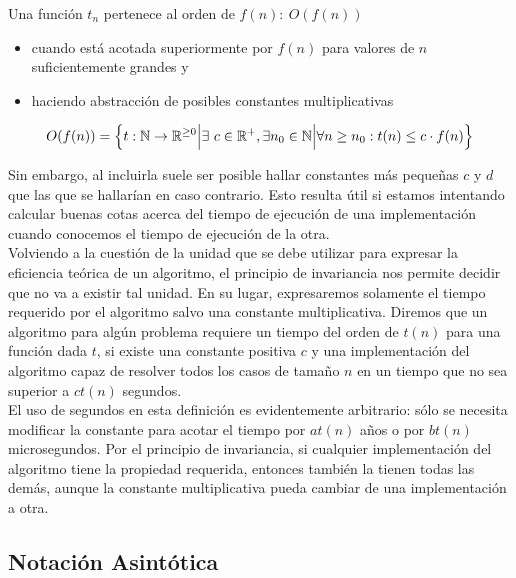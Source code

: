 \documentclass[a4paper,12pt]{article}
\begin{document}
\begin{fondo}
Una función $t_n$ pertenece al orden de $f(n):\ O(f(n))$
\begin{itemize}
\item cuando está acotada superiormente por $f(n)$ para valores de $n$ suficientemente grandes y
\item haciendo abstracción de posibles constantes multiplicativas
\end{itemize}
\begin{center}
\[O(f(n)) = \Bigl\{ t: \mathbb{N} \rightarrow \mathbb{R}^{\geq 0} \Bigl| \exists\ c \in \mathbb{R}^{+} , \exists n_{0} \in \mathbb{N} \Bigl| \forall n \geq n_{0} : t(n) \leq c \cdot f(n) \Bigl\} \]
\end{center}

\end{fondo}

Sin embargo, al incluirla suele ser posible hallar constantes más pequeñas $c$ y $d$ que las que se hallarían en caso contrario. Esto resulta útil si estamos intentando calcular buenas cotas acerca del tiempo de ejecución de una implementación cuando conocemos el tiempo de ejecución de la otra.\\

Volviendo a la cuestión de la unidad que se debe utilizar para expresar la eficiencia teórica de un algoritmo, el principio de invariancia nos permite decidir que no va a existir tal unidad. En su lugar, expresaremos solamente el tiempo requerido por el algoritmo salvo una constante multiplicativa. Diremos que un algoritmo para algún problema requiere un tiempo del orden de $t(n)$ para una función dada $t$, si existe una constante positiva $c$ y una implementación del algoritmo capaz de resolver todos los casos de tamaño $n$ en un tiempo que no sea superior a $ct(n)$ segundos. \\

El uso de segundos en esta definición es evidentemente arbitrario: sólo se necesita modificar la constante para acotar el tiempo por $at(n)$ años o por $bt(n)$ microsegundos. Por el principio de invariancia, si cualquier implementación del algoritmo tiene la propiedad requerida, entonces también la tienen todas las demás, aunque la constante multiplicativa pueda cambiar de una implementación a otra.\\

\subsection{Notación Asintótica}
\end{document}
